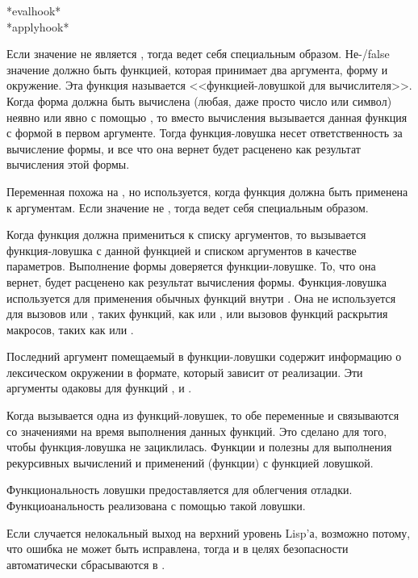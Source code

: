 \begin{defun}[Variable]
*evalhook* \\
*applyhook*

Если значение  не является {\false}, тогда  ведет себя
специальным образом. Не-{/false} значение  должно быть функцией,
которая принимает два аргумента, форму и окружение.
Эта функция называется <<функцией-ловушкой для вычислителя>>.
Когда форма должна быть вычислена (любая, даже просто число или символ) неявно или явно с
помощью , то вместо вычисления вызывается данная функция с формой в
первом аргументе.
Тогда функция-ловушка несет ответственность за вычисление формы, и все что она
вернет будет расценено как результат вычисления этой формы.

Переменная  похожа на , но используется, когда
функция должна быть применена к аргументам.
Если значение  не {\false}, тогда  ведет себя
специальным образом.

Когда функция должна примениться к списку аргументов, то вызывается
функция-ловушка с данной функцией и списком аргументов в качестве параметров.
Выполнение формы доверяется функции-ловушке. То, что она вернет, будет расценено
как результат вычисления формы.
Функция-ловушка используется для применения обычных функций внутри
. Она не используется для вызовов  или
, таких функций, как  или , или
вызовов функций раскрытия макросов, таких как  или .

Последний аргумент помещаемый в функции-ловушки содержит информацию о
лексическом окружении в формате, который зависит от реализации.
Эти аргументы одаковы для функций ,  и
.

Когда вызывается одна из функций-ловушек, то обе переменные  и
 связываются со значениями {\nil} на время выполнения данных
функций. Это сделано для того, чтобы функция-ловушка не зациклилась.
Функции  и  полезны для выполнения рекурсивных
вычислений и применений (функции) с функцией ловушкой.

Функциональность ловушки предоставляется для облегчения отладки.
Функциоанальность  реализована с помощью такой ловушки.

Если случается нелокальный выход на верхний уровень Lisp'а, возможно потому, что
ошибка не может быть исправлена, тогда  и 
в целях безопасности автоматически сбрасываются в {\false}.
\end{defun}


